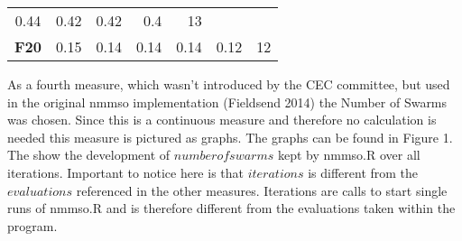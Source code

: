 \documentclass[12pt,a4paper]{article}
\begin{document}
\begin{longtable}[c]{@{}crrrrrr@{}}
\begin{minipage}[t]{0.08\columnwidth}
0.44
\strut\end{minipage} &
\begin{minipage}[t]{0.09\columnwidth}\raggedleft\strut
0.42
\strut\end{minipage} &
\begin{minipage}[t]{0.10\columnwidth}\raggedleft\strut
0.42
\strut\end{minipage} &
\begin{minipage}[t]{0.11\columnwidth}\raggedleft\strut
0.4
\strut\end{minipage} &
\begin{minipage}[t]{0.07\columnwidth}\raggedleft\strut
13
\strut\end{minipage}\tabularnewline
\begin{minipage}[t]{0.11\columnwidth}\centering\strut
\textbf{F20}
\strut\end{minipage} &
\begin{minipage}[t]{0.07\columnwidth}\raggedleft\strut
0.15
\strut\end{minipage} &
\begin{minipage}[t]{0.08\columnwidth}\raggedleft\strut
0.14
\strut\end{minipage} &
\begin{minipage}[t]{0.09\columnwidth}\raggedleft\strut
0.14
\strut\end{minipage} &
\begin{minipage}[t]{0.10\columnwidth}\raggedleft\strut
0.14
\strut\end{minipage} &
\begin{minipage}[t]{0.11\columnwidth}\raggedleft\strut
0.12
\strut\end{minipage} &
\begin{minipage}[t]{0.07\columnwidth}\raggedleft\strut
12
\strut\end{minipage}\tabularnewline
\bottomrule
\end{longtable}

As a fourth measure, which wasn't introduced by the CEC committee, but
used in the original nmmso implementation (Fieldsend 2014) the Number of
Swarms was chosen. Since this is a continuous measure and therefore no
calculation is needed this measure is pictured as graphs. The graphs can
be found in Figure 1. The show the development of \(number of swarms\)
kept by nmmso.R over all iterations. Important to notice here is that
\(iterations\) is different from the \(evaluations\) referenced in the
other measures. Iterations are calls to start single runs of nmmso.R and
is therefore different from the evaluations taken within the program.
\end{document}
